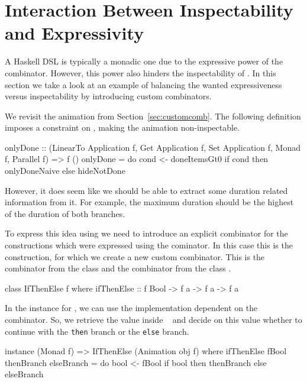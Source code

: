 \section{Interaction Between Inspectability and Expressivity}
\label{sec:interaction}

A Haskell DSL is typically a monadic one due to the expressive power of the \hs{>>=} combinator. However, this power also hinders the inspectability of \dsl{}. In this section we take a look at an example of balancing the wanted expressiveness versus inspectability by introducing custom combinators.

We revisit the  animation from Section~\ref{sec:customcomb}. The following definition imposes a  constraint on , making the animation non-inspectable.

\begin{spec}
onlyDone :: (LinearTo Application f, Get Application f,
  Set Application f, Monad f, Parallel f) => f ()
onlyDone = do
  cond <- doneItemsGt0
  if cond then onlyDoneNaive else hideNotDone
\end{spec}

However, it does seem like we should be able to extract some duration related information from it. For example, the maximum duration should be the highest of the duration of both branches.

To express this idea using \dsl{} we need to introduce an explicit combinator for the constructions which were expressed using the \hs{>>=} cominator. In this case this is the  construction, for which we create a new custom combinator. This is the  combinator from the  class \cite{DBLP:phd/ethos/Yallop10} and the  combinator from the  class \cite{Mokhov:2019:SAF:3352468.3341694}.

\begin{code}
class IfThenElse f where
  ifThenElse :: f Bool -> f a -> f a -> f a
\end{code}

In the instance for , we can use the implementation dependent on the \hs{>>=} combinator. So, we retrieve the value inside ~ and decide on this value whether to continue with the \texttt{then} branch or the \texttt{else} branch.

\begin{code}
instance (Monad f) => IfThenElse (Animation obj f) where
  ifThenElse fBool thenBranch elseBranch = do
    bool <- fBool
    if bool then thenBranch else elseBranch
\end{code}

